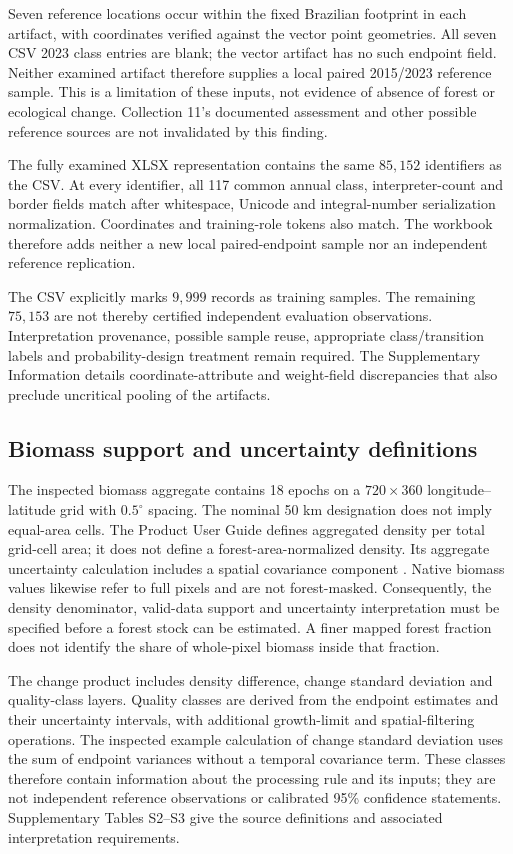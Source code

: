 \documentclass[11pt,a4paper]{article}
\begin{document}
Seven reference locations occur within the fixed Brazilian footprint in each artifact, with coordinates verified against the vector point geometries. All seven CSV 2023 class entries are blank; the vector artifact has no such endpoint field. Neither examined artifact therefore supplies a local paired 2015/2023 reference sample. This is a limitation of these inputs, not evidence of absence of forest or ecological change. Collection 11's documented assessment and other possible reference sources are not invalidated by this finding.

The fully examined XLSX representation contains the same $85{,}152$ identifiers as the CSV. At every identifier, all 117 common annual class, interpreter-count and border fields match after whitespace, Unicode and integral-number serialization normalization. Coordinates and training-role tokens also match. The workbook therefore adds neither a new local paired-endpoint sample nor an independent reference replication.

The CSV explicitly marks $9{,}999$ records as training samples. The remaining $75{,}153$ are not thereby certified independent evaluation observations. Interpretation provenance, possible sample reuse, appropriate class/transition labels and probability-design treatment remain required. The Supplementary Information details coordinate-attribute and weight-field discrepancies that also preclude uncritical pooling of the artifacts.

\subsection{Biomass support and uncertainty definitions}
The inspected biomass aggregate contains 18 epochs on a $720\times360$ longitude--latitude grid with $0.5^\circ$ spacing. The nominal 50 km designation does not imply equal-area cells. The Product User Guide defines aggregated density per total grid-cell area; it does not define a forest-area-normalized density. Its aggregate uncertainty calculation includes a spatial covariance component \citep{PUG2026}. Native biomass values likewise refer to full pixels and are not forest-masked. Consequently, the density denominator, valid-data support and uncertainty interpretation must be specified before a forest stock can be estimated. A finer mapped forest fraction does not identify the share of whole-pixel biomass inside that fraction.

The change product includes density difference, change standard deviation and quality-class layers. Quality classes are derived from the endpoint estimates and their uncertainty intervals, with additional growth-limit and spatial-filtering operations. The inspected example calculation of change standard deviation uses the sum of endpoint variances without a temporal covariance term. These classes therefore contain information about the processing rule and its inputs; they are not independent reference observations or calibrated 95\% confidence statements. Supplementary Tables S2--S3 give the source definitions and associated interpretation requirements.
\end{document}
